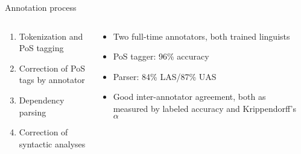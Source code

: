 \documentclass{ltgposter12}
\newcommand\deprel[1]{\\\textsc{#1}}
\begin{document}
\begin{columns}[t]
\begin{column}{0.20\textwidth}
            \begin{center}
            \end{center}
    \end{column}

    \begin{column}{0.45\textwidth}
        \begin{block}{Annotation process}
            \begin{columns}[T]
                \begin{column}{0.45\textwidth}
                    \begin{enumerate}
                        \item Tokenization and PoS tagging
                        \item Correction of PoS tags by annotator
                        \item Dependency parsing
                        \item Correction of syntactic analyses
                    \end{enumerate}
                \end{column}

                \begin{column}{0.45\textwidth}
                    \begin{itemize}
                        \item Two full-time annotators, both trained linguists
                        \item PoS tagger: 96\% accuracy
                        \item Parser: 84\% LAS/87\% UAS
                        \item Good inter-annotator agreement, both as measured
                            by labeled accuracy and Krippendorff's $\alpha$
                    \end{itemize}
                \end{column}
            \end{columns}
        \end{block}


\end{column}
\end{columns}
\end{document}
